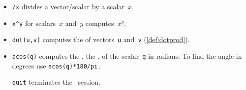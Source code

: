 \begin{itemize}
\itemlo The  \(\uv\cdot(\vv\times\wv)\) (\cref{def:sctrpr}) is the volume of the parallelepiped with edges~\uv, \vv\ and~\wv.





\subsubsection{Use \script\ for vector computation}

\itemhi \verb|[ ... ]| forms vectors: use \(n\)~numbers separated by semi-colons for vectors in~\(\RR^n\) (or use newlines instead of the semi-colons).  

\itemhi \verb|=| assigns the result of the expression to the right of the~\verb|=| to the variable name on the left.

\itemme \verb|norm(v)| computes the \slash {} of the vector~\verb|v| (\cref{def:veclen}).

\itemme \verb|+,-,*| is vector\slash scalar addition, subtraction, and multiplication.
Parentheses \verb|()| control the order of operations.

\item \verb|/x| divides a vector\slash scalar by a scalar~\(x\).

\item \verb|x^y| for scalars~\(x\) and~\(y\) computes~\(x^y\).

\item \verb|dot(u,v)| computes the  of vectors~\verb|u| and~\verb|v| (\cref{def:dotprod}).

\item \verb|acos(q)| computes the , the , of the scalar~\verb|q| in radians.  
To find the angle in degrees use \verb|acos(q)*180/pi|\,.

\itemhi \verb|quit| terminates the \script\ session.





\end{itemize}


\makeanswers
